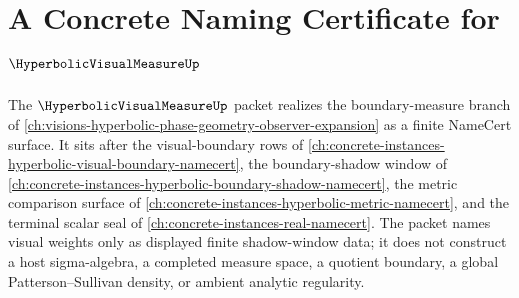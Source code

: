 \chapter{A Concrete Naming Certificate for $\HyperbolicVisualMeasureUp$}
\label{ch:concrete-instances-hyperbolic-visual-measure-namecert}

The $\HyperbolicVisualMeasureUp$ packet realizes the boundary-measure branch of \autoref{ch:visions-hyperbolic-phase-geometry-observer-expansion} as a finite NameCert surface. It sits after the visual-boundary rows of \autoref{ch:concrete-instances-hyperbolic-visual-boundary-namecert}, the boundary-shadow window of \autoref{ch:concrete-instances-hyperbolic-boundary-shadow-namecert}, the metric comparison surface of \autoref{ch:concrete-instances-hyperbolic-metric-namecert}, and the terminal scalar seal of \autoref{ch:concrete-instances-real-namecert}. The packet names visual weights only as displayed finite shadow-window data; it does not construct a host sigma-algebra, a completed measure space, a quotient boundary, a global Patterson--Sullivan density, or ambient analytic regularity.

